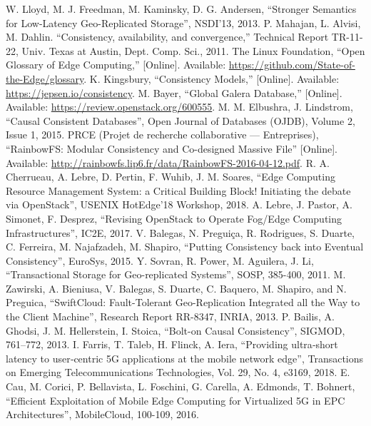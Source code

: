 \documentclass[conference]{IEEEtran}
\begin{document}
\begin{thebibliography}{00}
 W. Lloyd, M. J. Freedman, M. Kaminsky, D. G. Andersen, ``Stronger Semantics for Low-Latency Geo-Replicated Storage'', NSDI'13, 2013.
 P. Mahajan, L. Alvisi, M. Dahlin. ``Consistency, availability, and convergence,'' Technical Report TR-11-22, Univ. Texas at Austin, Dept. Comp. Sci., 2011.
\newpage
{} The Linux Foundation, ``Open Glossary of Edge Computing,'' [Online]. \newline Available: \url{https://github.com/State-of-the-Edge/glossary}.
 K. Kingsbury, ``Consistency Models,'' [Online]. Available: \newline \url{https://jepsen.io/consistency}.
 M. Bayer, ``Global Galera Database,'' [Online]. Available: \newline \url{https://review.openstack.org/600555}.
 M. M. Elbushra, J. Lindstrom, ``Causal Consistent Databases'', Open Journal of Databases (OJDB), Volume 2, Issue 1, 2015.
 PRCE (Projet de recherche collaborative — Entreprises), ``RainbowFS: Modular Consistency and Co-designed Massive File'' [Online]. Available: \url{http://rainbowfs.lip6.fr/data/RainbowFS-2016-04-12.pdf}.
 R. A. Cherrueau, A. Lebre, D. Pertin, F. Wuhib, J. M. Soares, ``Edge Computing Resource Management System: a Critical Building Block! Initiating the debate via OpenStack'', USENIX HotEdge’18 Workshop, 2018.
 A. Lebre, J. Pastor, A. Simonet, F. Desprez, ``Revising OpenStack to Operate Fog/Edge Computing Infrastructures'', IC2E, 2017.
 V. Balegas, N. Preguiça, R. Rodrigues, S. Duarte, C. Ferreira, M. Najafzadeh, M. Shapiro, ``Putting Consistency back into Eventual Consistency'', EuroSys, 2015.
 Y. Sovran, R. Power, M. Aguilera, J. Li, ``Transactional Storage for Geo-replicated Systems'', SOSP, 385-400, 2011.
 M. Zawirski, A. Bieniusa, V. Balegas, S. Duarte, C. Baquero, M. Shapiro, and N. Preguica, ``SwiftCloud: Fault-Tolerant Geo-Replication Integrated all the Way to the Client Machine'', Research Report RR-8347, INRIA, 2013.
 P. Bailis, A. Ghodsi, J. M. Hellerstein, I. Stoica, ``Bolt-on Causal Consistency'', SIGMOD, 761–772, 2013.
 I. Farris, T. Taleb, H. Flinck, A. Iera, ``Providing ultra‐short latency to user‐centric 5G applications at the mobile network edge'', Transactions on Emerging Telecommunications Technologies, Vol. 29, No. 4, e3169, 2018.
 E. Cau, M. Corici, P. Bellavista, L. Foschini, G. Carella, A. Edmonds, T. Bohnert, ``Efficient Exploitation of Mobile Edge Computing for Virtualized 5G in EPC Architectures'', MobileCloud, 100-109, 2016.

\end{thebibliography}
\end{document}
